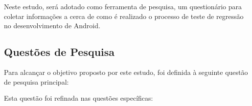 Neste estudo, será adotado como ferramenta de pesquisa, um questionário para coletar informações a cerca de como é realizado o processo de teste de regressão no desenvolvimento de  Android.

\subsection{Questões de Pesquisa}
Para alcançar o objetivo proposto por este estudo, foi definida à seguinte questão de pesquisa principal:
\leavevspace 

\begin{center}
    \noindent{}
\end{center}

\vspace{.5em}

Esta questão foi refinada nas questões específicas:
\vspace{.5em}

